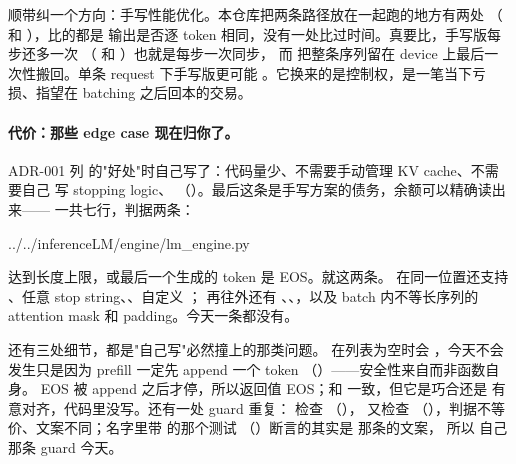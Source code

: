 顺带纠一个方向：手写性能优化。本仓库把两条路径放在一起跑的地方有两处
（ 和 ），比的都是
输出是否逐 token 相同，没有一处比过时间。真要比，手写版每步还多一次 
（ 和 ）也就是每步一次同步，
而  把整条序列留在 device 上最后一次性搬回。单条 request 下手写版更可能
。它换来的是控制权，是一笔当下亏损、指望在 batching 之后回本的交易。

\paragraph{代价：那些 edge case 现在归你了。}
ADR-001 列  的"好处"时自己写了：代码量少、不需要手动管理 KV cache、不需要自己
写 stopping logic、
（）。最后这条是手写方案的债务，余额可以精确读出
来—— 一共七行，判据两条：

%
  {../../inferenceLM/engine/lm_engine.py}

达到长度上限，或最后一个生成的 token 是 EOS。就这两条。 在同一位置还支持
、任意 stop string、、自定义 ；
再往外还有 、、，以及
batch 内不等长序列的 attention mask 和 padding。今天一条都没有。

还有三处细节，都是"自己写"必然撞上的那类问题。 在列表为空时会
，今天不会发生只是因为 prefill 一定先 append 一个 token
（）——安全性来自而非函数自身。
EOS 被 append 之后才停，所以返回值 EOS；和  一致，但它是巧合还是
有意对齐，代码里没写。还有一处 guard 重复： 检查 
（）， 又检查
（），判据不等价、文案不同；名字里带  的那个测试
（）断言的其实是  那条的文案，
所以  自己那条 guard 今天。

